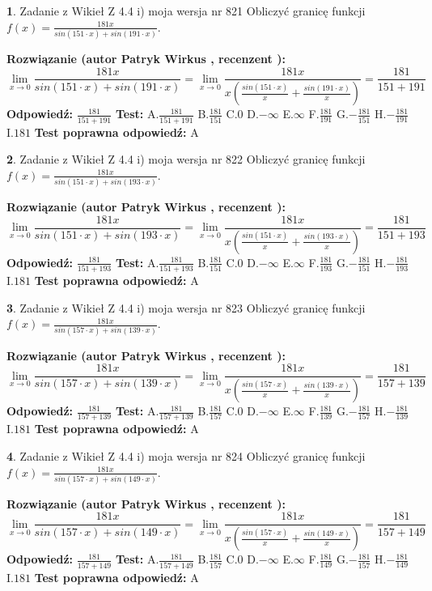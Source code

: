 \documentclass[12pt, a4paper]{article}
\theoremstyle{definition} %
\newtheorem{zad}{}
\newcommand{\zadStart}[1]{\begin{zad}#1\newline}
\newcommand{\zadStop}{\end{zad}}
\newcommand{\rozwStart}[2]{\noindent \textbf{Rozwiązanie (autor #1 , recenzent #2): }\newline}
\newcommand{\rozwStop}{\newline}
\newcommand{\odpStart}{\noindent \textbf{Odpowiedź:}\newline}
\newcommand{\odpStop}{\newline}
\newcommand{\testStart}{\noindent \textbf{Test:}\newline}
\newcommand{\testStop}{\newline}
\newcommand{\kluczStart}{\noindent \textbf{Test poprawna odpowiedź:}\newline}
\newcommand{\kluczStop}{\newline}
\begin{document}
\zadStart{Zadanie z Wikieł Z 4.4 i) moja wersja nr 821}
Obliczyć granicę funkcji $f(x)=\frac{181x}{sin(151\cdot x) +sin(191\cdot x)}$.
\zadStop
\rozwStart{Patryk Wirkus}{}
$$\lim\limits_{x\to 0}\frac{181x}{sin(151\cdot x) +sin(191\cdot x)}=\lim\limits_{x\to 0}\frac{181x}{x(\frac{sin(151\cdot x)}{x}+\frac{sin(191\cdot x)}{x})}=\frac{181}{151+191}$$
\rozwStop
\odpStart
$\frac{181}{151+191}$
\odpStop
\testStart
A.$\frac{181}{151+191}$
B.$\frac{181}{151}$
C.$0$
D.$-\infty$
E.$\infty$
F.$\frac{181}{191}$
G.$-\frac{181}{151}$
H.$-\frac{181}{191}$
I.$181$
\testStop
\kluczStart
A
\kluczStop



\zadStart{Zadanie z Wikieł Z 4.4 i) moja wersja nr 822}
Obliczyć granicę funkcji $f(x)=\frac{181x}{sin(151\cdot x) +sin(193\cdot x)}$.
\zadStop
\rozwStart{Patryk Wirkus}{}
$$\lim\limits_{x\to 0}\frac{181x}{sin(151\cdot x) +sin(193\cdot x)}=\lim\limits_{x\to 0}\frac{181x}{x(\frac{sin(151\cdot x)}{x}+\frac{sin(193\cdot x)}{x})}=\frac{181}{151+193}$$
\rozwStop
\odpStart
$\frac{181}{151+193}$
\odpStop
\testStart
A.$\frac{181}{151+193}$
B.$\frac{181}{151}$
C.$0$
D.$-\infty$
E.$\infty$
F.$\frac{181}{193}$
G.$-\frac{181}{151}$
H.$-\frac{181}{193}$
I.$181$
\testStop
\kluczStart
A
\kluczStop



\zadStart{Zadanie z Wikieł Z 4.4 i) moja wersja nr 823}
Obliczyć granicę funkcji $f(x)=\frac{181x}{sin(157\cdot x) +sin(139\cdot x)}$.
\zadStop
\rozwStart{Patryk Wirkus}{}
$$\lim\limits_{x\to 0}\frac{181x}{sin(157\cdot x) +sin(139\cdot x)}=\lim\limits_{x\to 0}\frac{181x}{x(\frac{sin(157\cdot x)}{x}+\frac{sin(139\cdot x)}{x})}=\frac{181}{157+139}$$
\rozwStop
\odpStart
$\frac{181}{157+139}$
\odpStop
\testStart
A.$\frac{181}{157+139}$
B.$\frac{181}{157}$
C.$0$
D.$-\infty$
E.$\infty$
F.$\frac{181}{139}$
G.$-\frac{181}{157}$
H.$-\frac{181}{139}$
I.$181$
\testStop
\kluczStart
A
\kluczStop



\zadStart{Zadanie z Wikieł Z 4.4 i) moja wersja nr 824}
Obliczyć granicę funkcji $f(x)=\frac{181x}{sin(157\cdot x) +sin(149\cdot x)}$.
\zadStop
\rozwStart{Patryk Wirkus}{}
$$\lim\limits_{x\to 0}\frac{181x}{sin(157\cdot x) +sin(149\cdot x)}=\lim\limits_{x\to 0}\frac{181x}{x(\frac{sin(157\cdot x)}{x}+\frac{sin(149\cdot x)}{x})}=\frac{181}{157+149}$$
\rozwStop
\odpStart
$\frac{181}{157+149}$
\odpStop
\testStart
A.$\frac{181}{157+149}$
B.$\frac{181}{157}$
C.$0$
D.$-\infty$
E.$\infty$
F.$\frac{181}{149}$
G.$-\frac{181}{157}$
H.$-\frac{181}{149}$
I.$181$
\testStop
\kluczStart
A
\kluczStop
\end{document}
